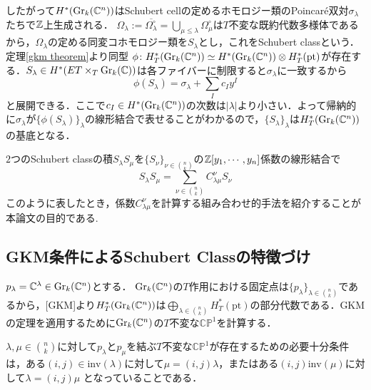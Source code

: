 したがって$H^*(\text{Gr}_k(\mathbb{C}^n))$はSchubert cellの定めるホモロジー類のPoincar\'e双対$\sigma_\lambda$たちで$\mathbb{Z}$上生成される．
$\Omega_\lambda:=\overline{\Omega_\lambda^\circ}=\bigcup_{\mu\leq\lambda}\Omega_\mu^\circ$は$T$不変な既約代数多様体であるから，$\Omega_\lambda$の定める同変コホモロジー類を$S_\lambda$とし，これをSchubert classという．
定理\ref{gkm theorem}より同型
$\phi\colon H^*_T(\text{Gr}_k(\mathbb{C}^n))\simeq H^*(\text{Gr}_k(\mathbb{C}^n))\otimes H^*_T(\text{pt})$が存在する．$S_\lambda\in H^*(ET\times_T\text{Gr}_k(\mathbb{C}))$は各ファイバーに制限すると$\sigma_\lambda$に一致するから
\[
\phi(S_\lambda) = \sigma_\lambda + \sum_{I}c_Iy^I
\]
と展開できる．ここで$c_I\in H^*(\text{Gr}_k(\mathbb{C}^n))$の次数は$|\lambda|$より小さい．よって帰納的に$\sigma_\lambda$が$\{\phi(S_\lambda)\}_\lambda$の線形結合で表せることがわかるので，$\{S_\lambda\}_\lambda$は$H^*_T(\text{Gr}_k(\mathbb{C}^n))$の基底となる．


$2$つのSchubert classの積$S_\lambda S_\mu$を$\{S_\nu\}_{\nu\in\binom{n}{k}}$の$\mathbb{Z}[y_1,\cdots,y_n]$係数の線形結合で
\begin{equation}\label{LRcoeff}
  S_\lambda S_\mu=\sum_{\nu\in\binom{n}{k}}C^\nu_{\lambda\mu}S_\nu
\end{equation}
このように表したとき，係数$C^{\nu}_{\lambda\mu}$を計算する組み合わせ的手法を紹介することが本論文の目的である.





\subsection{GKM条件によるSchubert Classの特徴づけ}

$p_\lambda = \mathbb{C}^\lambda\in\text{Gr}_k(\mathbb{C}^n)$とする．
$\text{Gr}_k(\mathbb{C}^n)$の$T$作用における固定点は$\{p_\lambda\}_{\lambda\in\binom{n}{k}}$であるから，[GKM]より$H^*_T(\text{Gr}_k(\mathbb{C}^n))$は$\bigoplus_{\lambda\in\binom{n}{k}}H^*_T(\text{pt})$の部分代数である．GKMの定理を適用するために$\text{Gr}_k(\mathbb{C}^n)$の$T$不変な$\mathbb{CP}^1$を計算する．

\begin{prop}
  $\lambda,\mu\in\binom{n}{k}$に対して$p_\lambda$と$p_\mu$を結ぶ$T$不変な$\mathbb{CP}^1$が存在するための必要十分条件は，ある$(i, j)\in\text{inv}(\lambda)$に対して$\mu = (i, j)\lambda$，またはある$(i,j)\text{inv}(\mu)$に対して$\lambda = (i, j)\mu$
  となっていることである．
\end{prop}

